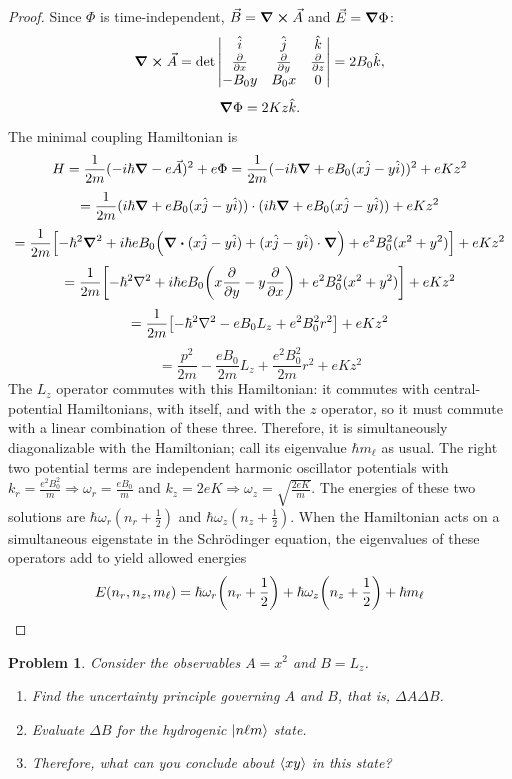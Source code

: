 \documentclass{article}
\newtheorem{plm}{Problem}
\begin{document}
\begin{proof}
  Since $\Phi$ is time-independent, $\vec{B} = \curl{\vec{A}}$ and $\vec{E} = \grad{\Phi}$:
  \[
    \curl{\vec{A}} = \det
    \begin{vmatrix}
      \hat{i} & \hat{j} & \hat{k} \\
      \pdv{x} & \pdv{y} & \pdv{z} \\
      -B_{0}y & B_{0}x & 0
    \end{vmatrix}
    = 2B_{0}\hat{k},
  \]
  \[
    \grad{\Phi} = 2Kz\hat{k}.
  \]

  The minimal coupling Hamiltonian is
  \[
    H = \frac{1}{2m}(-i\hbar\grad - e\vec{A})^{2} + e\Phi
    = \frac{1}{2m}(-i\hbar\grad + eB_{0}(x\hat{j} - y\hat{i}))^{2} + eKz^{2}
  \]
  \[
    = \frac{1}{2m}(i\hbar\grad + eB_{0}(x\hat{j} - y\hat{i})) \cdot (i\hbar\grad + eB_{0}(x\hat{j} - y\hat{i})) + eKz^{2}
  \]
  \[
    = \frac{1}{2m}\qty[-\hbar^{2}\grad^{2} + i\hbar eB_{0}\qty(\div{(x\hat{j} - y\hat{i})} + (x\hat{j} - y\hat{i}) \cdot \grad)
    + e^{2}B_{0}^{2}(x^{2} + y^{2})] + eKz^{2}
  \]
  \[
    = \frac{1}{2m}\qty[-\hbar^{2}\laplacian + i\hbar eB_{0}\qty(x\pdv{y} - y\pdv{x}) + e^{2}B_{0}^{2}(x^{2} + y^{2})] + eKz^{2}
  \]
  \[
    = \frac{1}{2m}\qty[-\hbar^{2}\laplacian - eB_{0}L_{z} + e^{2}B_{0}^{2}r^{2}] + eKz^{2}
  \]
  \[
    = \frac{p^{2}}{2m} - \frac{eB_{0}}{2m}L_{z} + \frac{e^{2}B_{0}^{2}}{2m}r^{2} + eKz^{2}
  \]
  The $L_{z}$ operator commutes with this Hamiltonian: it commutes with central-potential Hamiltonians, with itself,
  and with the $z$ operator, so it must commute with a linear combination of these three.
  Therefore, it is simultaneously diagonalizable with the Hamiltonian; call its eigenvalue $\hbar m_{\ell}$ as usual.
  The right two potential terms are independent harmonic oscillator potentials with
  $k_{r} = \frac{e^{2}B_{0}^{2}}{m} \Rightarrow \omega_{r} = \frac{eB_{0}}{m}$
  and $k_{z} = 2eK \Rightarrow \omega_{z} = \sqrt{\frac{2eK}{m}}$.
  The energies of these two solutions are $\hbar\omega_{r}(n_{r} + \frac{1}{2})$ and $\hbar\omega_{z}(n_{z} + \frac{1}{2})$.
  When the Hamiltonian acts on a simultaneous eigenstate in the Schr\"odinger equation, the eigenvalues of these operators add
  to yield allowed energies
  \[
    E(n_{r}, n_{z}, m_{\ell}) = \hbar\omega_{r}\qty(n_{r} + \frac{1}{2}) + \hbar\omega_{z}\qty(n_{z} + \frac{1}{2}) + \hbar m_{\ell}
  \]
\end{proof}

\begin{plm}
  Consider the observables $A = x^{2}$ and $B = L_{z}$.
  \begin{enumerate}
  \item Find the uncertainty principle governing $A$ and $B$, that is, $\Delta A\Delta B$.
  \item Evaluate $\Delta B$ for the hydrogenic $\ket{n\ell m}$ state.
  \item Therefore, what can you conclude about $\expval{xy}$ in this state?
  \end{enumerate}
\end{plm}
\end{document}
